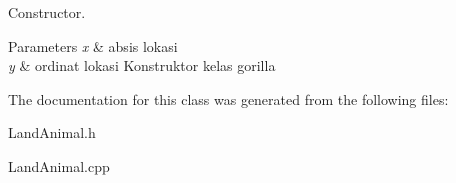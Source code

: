 Constructor. 


\begin{DoxyParams}{Parameters}
{\em x} & absis lokasi \\
\hline
{\em y} & ordinat lokasi Konstruktor kelas gorilla \\
\hline
\end{DoxyParams}


The documentation for this class was generated from the following files\+:\begin{DoxyCompactItemize}
\item 
Land\+Animal.\+h\item 
Land\+Animal.\+cpp\end{DoxyCompactItemize}
